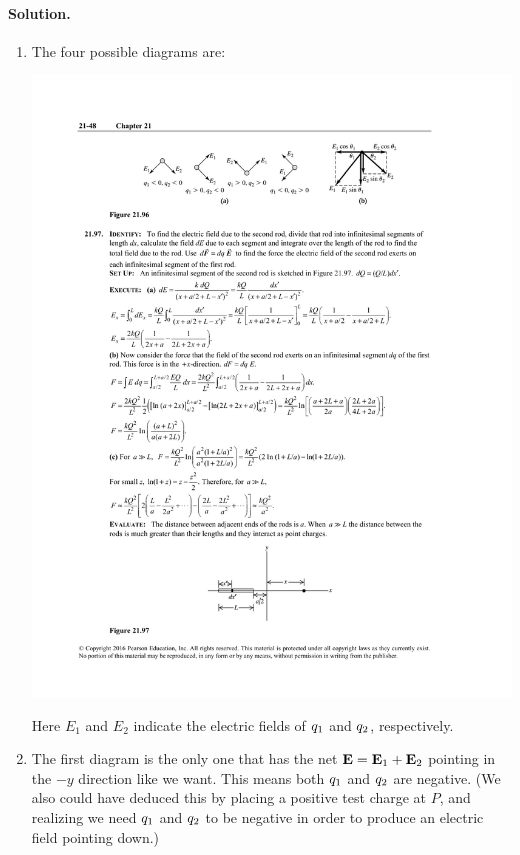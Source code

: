 \documentclass[11pt]{article}
\newenvironment{solution}
{
    \paragraph{Solution.}
    \ignorespaces
}
{
    \bigskip
}
\begin{document}
\begin{solution}
	\begin{enumerate}
		\item The four possible diagrams are:
		
		\begin{center}
			\includegraphics[scale=1.5]{P21-96a}
		\end{center}
		
		Here $E_1$ and $E_2$ indicate the electric fields of $q_1$ and $q_2$, respectively.
		
		\item The first diagram is the only one that has the net $\mathbf{E} = \mathbf{E}_1 + \mathbf{E}_2$ pointing in the $-y$ direction like we want.  This means both $q_1$ and $q_2$ are negative.  (We also could have deduced this by placing a positive test charge at $P$, and realizing we need $q_1$ and $q_2$ to be negative in order to produce an electric field pointing down.)
		

\end{enumerate}
\end{solution}
\end{document}
